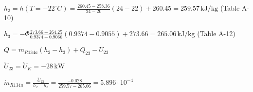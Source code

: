 \( h_2 = h(T = -22^\circ C) = \frac{260.45 - 258.36}{24 - 20} (24 - 22) + 260.45 = 259.57 \, \text{kJ/kg} \)  
(Table A-10)  

\( h_3 = -\Phi \frac{273.66 - 264.25}{0.9374 - 0.9066} (0.9374 - 0.9055) + 273.66 = 265.06 \, \text{kJ/kg} \)  
(Table A-12)  

\( Q = \dot{m}_{R134a} (h_2 - h_3) + \dot{Q}_{23} - \dot{U}_{23} \)  

\( \dot{U}_{23} = \dot{U}_K = -28 \, \text{kW} \)  

\( \dot{m}_{R134a} = \frac{\dot{U}_{23}}{h_2 - h_3} = \frac{-0.028}{259.57 - 265.06} = 5.896 \cdot 10^{-4} \)